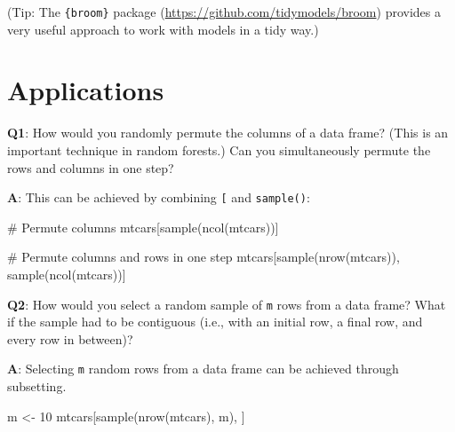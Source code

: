 \documentclass[
]{krantz}
\makeatletter
\newenvironment{Shaded}{\begin{snugshade}}{\end{snugshade}}
\newcommand{\CommentTok}[1]{\textcolor[rgb]{0.56,0.35,0.01}{\textit{#1}}}
\newcommand{\DecValTok}[1]{\textcolor[rgb]{0.00,0.00,0.81}{#1}}
\newcommand{\KeywordTok}[1]{\textcolor[rgb]{0.13,0.29,0.53}{\textbf{#1}}}
\newcommand{\NormalTok}[1]{#1}
\newcommand{\OperatorTok}[1]{\textcolor[rgb]{0.81,0.36,0.00}{\textbf{#1}}}
\newcommand{\StringTok}[1]{\textcolor[rgb]{0.31,0.60,0.02}{#1}}
\renewcommand{\href}[2]{#2 (\url{#1})}
\newenvironment{kframe}{%
\medskip{}
\setlength{\fboxsep}{.8em}
 \def\at@end@of@kframe{}%
 \ifinner\ifhmode%
  \def\at@end@of@kframe{\end{minipage}}%
  \begin{minipage}{\columnwidth}%
 \fi\fi%
 \def\FrameCommand##1{\hskip\@totalleftmargin \hskip-\fboxsep
 \colorbox{shadecolor}{##1}\hskip-\fboxsep
     \hskip-\linewidth \hskip-\@totalleftmargin \hskip\columnwidth}%
 \MakeFramed {\advance\hsize-\width
   \@totalleftmargin\z@ \linewidth\hsize
   \@setminipage}}%
 {\par\unskip\endMakeFramed%
 \at@end@of@kframe}
\renewenvironment{Shaded}{\begin{kframe}}{\end{kframe}}
\renewcommand{\KeywordTok} [1]{\textcolor[rgb]{0.00,0.44,0.13}{{#1}}}
\renewcommand{\DecValTok}  [1]{\textcolor[rgb]{0.25,0.63,0.44}{{#1}}}
\renewcommand{\StringTok}  [1]{\textcolor[rgb]{0.25,0.44,0.63}{{#1}}}
\renewcommand{\CommentTok} [1]{\textcolor[rgb]{0.38,0.63,0.69}{{#1}}}
\renewcommand{\NormalTok}  [1]{{#1}}
\makeatother
\begin{document}
\begin{Shaded}
\end{Shaded}

(Tip: The \href{https://github.com/tidymodels/broom}{\texttt{\{broom\}} package} provides a very useful approach to work with models in a tidy way.)


\hypertarget{applications}{%
\section{Applications}\label{applications}}

\textbf{{Q1}}: How would you randomly permute the columns of a data frame? (This is an important technique in random forests.) Can you simultaneously permute the rows and columns in one step?

\textbf{{A}}: This can be achieved by combining \texttt{{[}} and \texttt{sample()}:

\begin{Shaded}
\begin{Highlighting}[]
\CommentTok{# Permute columns}
\NormalTok{mtcars[}\KeywordTok{sample}\NormalTok{(}\KeywordTok{ncol}\NormalTok{(mtcars))]}

\CommentTok{# Permute columns and rows in one step}
\NormalTok{mtcars[}\KeywordTok{sample}\NormalTok{(}\KeywordTok{nrow}\NormalTok{(mtcars)), }\KeywordTok{sample}\NormalTok{(}\KeywordTok{ncol}\NormalTok{(mtcars))]}
\end{Highlighting}
\end{Shaded}

\textbf{{Q2}}: How would you select a random sample of \texttt{m} rows from a data frame? What if the sample had to be contiguous (i.e., with an initial row, a final row, and every row in between)?

\textbf{{A}}: Selecting \texttt{m} random rows from a data frame can be achieved through subsetting.

\begin{Shaded}
\begin{Highlighting}[]
\NormalTok{m <-}\StringTok{ }\DecValTok{10}
\NormalTok{mtcars[}\KeywordTok{sample}\NormalTok{(}\KeywordTok{nrow}\NormalTok{(mtcars), m), ]}
\end{Highlighting}
\end{Shaded}
\end{document}
